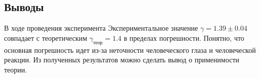 \documentclass[a4paper]{article}
\begin{document}
\subsection{Выводы}
В ходе проведения эксперимента Экспериментальное значение \( \gamma = 1.39 \pm 0.04 \) совпадает с теоретическим \( \gamma_{\text{теор}} = 1.4 \) в пределах погрешности.
Понятно, что основная погрешность идет из-за неточности человеческого глаза и человеческой реакции. Из полученных результатов можно сделать вывод о применимости теории.
\end{document}
